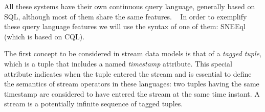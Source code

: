 All these systems have their own continuous query language, generally based on SQL, although most of them share the
same features.
\ %
In order to exemplify these query language features we will use the syntax of one of them: SNEEql
\cite{Brenninkmeijer_08} (which is based on CQL).
%
%

The first concept to be considered in stream data models is that of a \textit{tagged tuple}, which is a tuple that
includes a named \textit{timestamp} attribute. This special attribute indicates when the tuple entered the stream and
is essential to define the semantics of stream operators in these languages: two tuples having the same timestamp are
considered to have entered the stream at the same time instant. A stream is a potentially infinite sequence of tagged
tuples.

